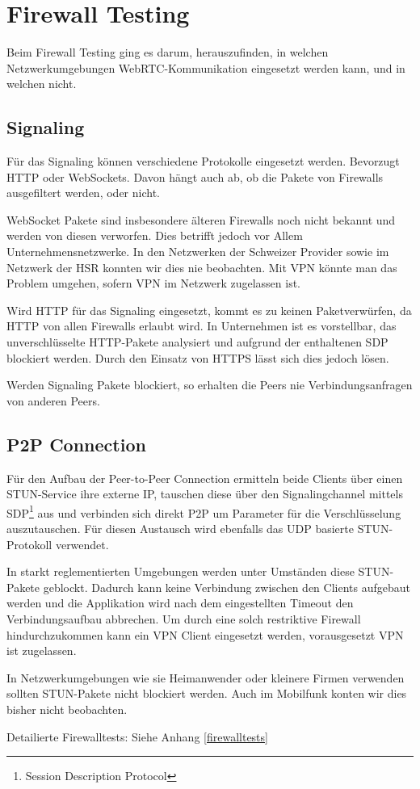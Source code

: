	
	
\chapter{Firewall Testing}
	Beim Firewall Testing ging es darum, herauszufinden, in welchen Netzwerkumgebungen WebRTC-Kommunikation eingesetzt werden kann, und in welchen nicht.
	
	
	\section{Signaling}
		Für das Signaling können verschiedene Protokolle eingesetzt werden. Bevorzugt HTTP oder WebSockets. Davon hängt auch ab, ob die Pakete von Firewalls ausgefiltert werden, oder nicht.
		
		WebSocket Pakete sind insbesondere älteren Firewalls noch nicht bekannt und werden von diesen verworfen. Dies betrifft jedoch vor Allem Unternehmensnetzwerke.
		In den Netzwerken der Schweizer Provider sowie im Netzwerk der HSR konnten wir dies nie beobachten.
		Mit VPN könnte man das Problem umgehen, sofern VPN im Netzwerk zugelassen ist.
		
		Wird HTTP für das Signaling eingesetzt, kommt es zu keinen Paketverwürfen, da HTTP von allen Firewalls erlaubt wird.
		In Unternehmen ist es vorstellbar, das unverschlüsselte HTTP-Pakete analysiert und aufgrund der enthaltenen SDP blockiert werden. Durch den Einsatz von HTTPS lässt sich dies jedoch lösen.
		
		Werden Signaling Pakete blockiert, so erhalten die Peers nie Verbindungsanfragen von anderen Peers.
		

	\section{P2P Connection}
		Für den Aufbau der Peer-to-Peer Connection ermitteln beide Clients über einen
		STUN-Service ihre externe IP, tauschen diese über den Signalingchannel
		mittels SDP\footnote{Session Description Protocol} aus und verbinden sich
		direkt P2P um Parameter für die Verschlüsselung auszutauschen. Für diesen
		Austausch wird ebenfalls das UDP basierte STUN-Protokoll verwendet.
		
		In starkt reglementierten Umgebungen werden unter Umständen diese STUN-Pakete
		geblockt. Dadurch kann keine Verbindung zwischen den Clients aufgebaut werden und die Applikation wird nach dem eingestellten Timeout den Verbindungsaufbau abbrechen. 
		Um durch eine solch restriktive Firewall hindurchzukommen kann ein VPN Client eingesetzt werden, vorausgesetzt VPN ist zugelassen.
		
		In Netzwerkumgebungen wie sie Heimanwender oder kleinere Firmen verwenden sollten STUN-Pakete nicht blockiert werden. Auch im Mobilfunk konten wir dies bisher nicht beobachten.
	
		Detailierte Firewalltests: Siehe Anhang \ref{firewalltests}
		
		